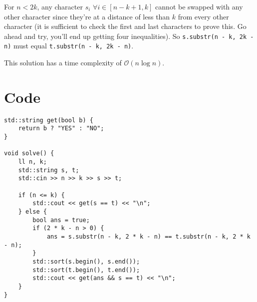 \documentclass{article}
\begin{document}
For $n<2k$, any character $s_i$ $\forall i \in [n-k+1, k]$ cannot be swapped with any other character since they're at a distance of less than $k$ from every other character (it is sufficient to check the first and last characters to prove this. Go ahead and try, you'll end up getting four inequalities). So \texttt{s.substr(n - k, 2k - n)} must equal \texttt{t.substr(n - k, 2k - n)}.

This solution has a time complexity of $\mathcal{O}(n \log n)$.
\section{Code}
\begin{verbatim}
std::string get(bool b) {
    return b ? "YES" : "NO";
}

void solve() {
    ll n, k;
    std::string s, t;
    std::cin >> n >> k >> s >> t;

    if (n <= k) {
        std::cout << get(s == t) << "\n";
    } else {
        bool ans = true;
        if (2 * k - n > 0) {
            ans = s.substr(n - k, 2 * k - n) == t.substr(n - k, 2 * k - n);
        }
        std::sort(s.begin(), s.end());
        std::sort(t.begin(), t.end());
        std::cout << get(ans && s == t) << "\n";
    }
}
\end{verbatim}
\end{document}
